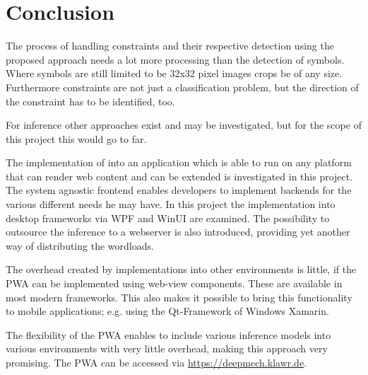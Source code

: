 \section{Conclusion}

The process of handling constraints and their respective detection using the proposed approach needs a lot more processing than the detection of symbols.
Where symbols are still limited to be 32x32 pixel images crops be of any size.
Furthermore constraints are not just a classification problem, but the direction of the constraint has to be identified, too.

For inference other approaches exist %
and may be investigated, but for the scope of this project this would go to far.

The implementation of  into an application which is able to run on any platform that can render web content and can be extended is investigated in this project.
The system agnostic frontend enables developers to implement backends for the various different needs he may have.
In this project the implementation into desktop frameworks via WPF and WinUI are examined.
The possibility to outsource the inference to a webserver is also introduced, providing yet another way of distributing the wordloads.

The overhead created by implementations into other environments is little, if the PWA can be implemented using web-view components.
These are available in most modern frameworks.
This also makes it possible to bring this functionality to mobile applications; e.g. using the Qt-Framework of Windows Xamarin.

The flexibility of the PWA enables to include various inference models into various environments with very little overhead, making this approach very promising.
The PWA can be accessed via \url{https://deepmech.klawr.de}.

